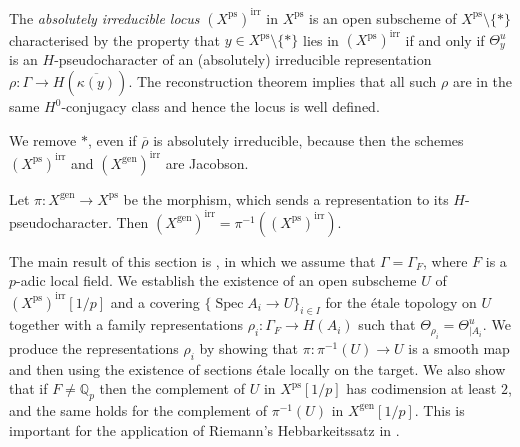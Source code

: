 \documentclass{amsart}
\theoremstyle{definition}
\theoremstyle{remark}
\DeclareMathOperator{\Spec}{Spec}
\newcommand{\Qp}{\mathbb {Q}_p}
\newcommand{\rhobar}{\overline{\rho}}
\newcommand{\gen}{\mathrm{gen}}
\newcommand{\irr}{\mathrm{irr}}
\newcommand{\ps}{\mathrm{ps}}
\begin{document}
 The \textit{absolutely irreducible locus} $(X^{\ps})^{\irr}$ in $X^{\ps}$ is an open subscheme of $X^{\ps} \setminus \{\ast\}$ 
 characterised by the property that 
 $y\in X^{\ps} \setminus \{\ast\}$ lies in $(X^{\ps})^{\irr}$
 if and only if $\Theta^u_y$ is an
 $H$-pseudocharacter of an 
 (absolutely) irreducible representation $\rho: \Gamma \rightarrow H(\overline{\kappa(y)})$. The reconstruction theorem  \cite[Theorem 3.8]{quast} implies that all such $\rho$ are in the same $H^0$-conjugacy class and hence the  
 locus is well defined. 
 
 We remove $\ast$, even if $\rhobar$ is absolutely irreducible, because
 then the schemes $(X^{\ps})^{\irr}$ and $(X^{\gen})^{\irr}$ are Jacobson. 
 
 Let $\pi: X^{\gen} \rightarrow X^{\ps}$ be the morphism, which sends a representation to 
 its $H$-pseudocharacter. Then $(X^{\gen})^{\irr}= \pi^{-1}((X^{\ps})^{\irr})$.
 
 The main result of this section is , in which we assume that $\Gamma=\Gamma_F$, where $F$ is a $p$-adic local field. We establish the existence of an open subscheme $U$ of 
 $(X^{\ps})^{\irr}[1/p]$ and a covering 
 $\{\Spec A_i\rightarrow U\}_{i\in I}$ for the \'etale topology on $U$ together 
 with a family representations $\rho_i: \Gamma_F\rightarrow H(A_i)$ such that $\Theta_{\rho_i}= \Theta^u_{|A_i}$. We produce
 the representations $\rho_i$ by showing that 
 $\pi: \pi^{-1}(U) \rightarrow U$ is a smooth map 
 and then using the existence of sections \'etale 
 locally on the target. We also show that if $F\neq \Qp$ 
 then the complement of $U$ in $X^{\ps}[1/p]$ has codimension 
 at least $2$, and the same holds for the complement 
 of $\pi^{-1}(U)$ in $X^{\gen}[1/p]$. This is important 
 for the application of Riemann's Hebbarkeitssatz
 in .
 
\end{document}
